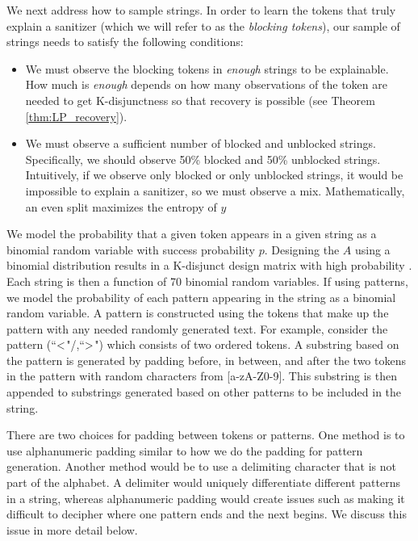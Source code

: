 We next address how to sample strings. In order to learn the tokens that truly explain a sanitizer (which we will refer to as the \emph{blocking tokens}), our sample of strings needs to satisfy the following conditions: 
\begin{itemize}
	\item We must observe the blocking tokens in \emph{enough} strings to be explainable. How much is \emph{enough} depends on how many observations of the token are needed to get K-disjunctness so that recovery is possible (see Theorem \ref{thm:LP_recovery}). 
	\item We must observe a sufficient number of blocked and unblocked strings. Specifically, we should observe 50\% blocked and 50\% unblocked strings. Intuitively, if we observe only blocked or only unblocked strings, it would be impossible to explain a sanitizer, so we must observe a mix. Mathematically, an even split maximizes the entropy of $y$	
\end{itemize} 
We model the probability that a given token appears in a given string as a binomial random variable with success probability $p$. Designing the $A$ using a binomial distribution results in a K-disjunct design matrix with high probability \cite{Malyutov78}. Each string is then a function of 70 binomial random variables. If using patterns, we model the probability of each pattern appearing in the string as a binomial random variable. A pattern is constructed using the tokens that make up the pattern with any needed randomly generated text.  For example, consider the pattern (``$\sf{<}$"/,``$\sf{>}$") which consists of two ordered tokens. A substring based on the pattern is generated by padding before, in between, and after the two tokens in the pattern with random characters from [a-zA-Z0-9]. This substring is then appended to substrings generated based on other patterns to be included in the string. 

There are two choices for padding between tokens or patterns. One method is to use alphanumeric padding similar to how we do the padding for pattern generation. Another method would be to use a delimiting character that is not part of the alphabet. A delimiter would uniquely differentiate different patterns in a string, whereas alphanumeric padding would create issues such as making it difficult to decipher where one pattern ends and the next begins. We discuss this issue in more detail below.

